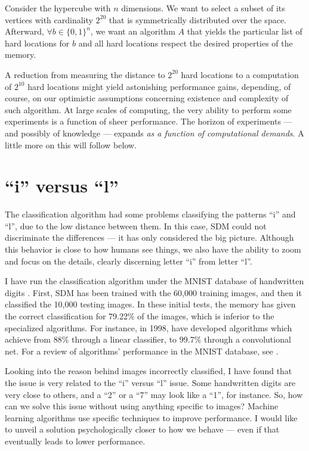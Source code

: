 Consider the hypercube with $n$ dimensions.  We want to select a subset of its vertices with cardinality $2^{20}$ that is symmetrically distributed over the space. Afterward, $\forall b \in \{ 0,1\} ^n$, we want an algorithm $A$ that yields the particular list of hard locations for $b$ and all hard locations respect the desired properties of the memory.

A reduction from measuring the distance to $2^{20}$ hard locations to a computation of $2^{10}$ hard locations might yield astonishing performance gains, depending, of course, on our optimistic assumptions concerning existence and complexity of such algorithm.  At large scales of computing, the very ability to perform some experiments is a function of sheer performance. The horizon of experiments --- and possibly of knowledge --- expands \emph{as a function of computational demands}. A little more on this will follow below.




\section{``i'' versus ``l''}

The classification algorithm had some problems classifying the patterns ``i'' and ``l'', due to the low distance between them. In this case, SDM could not discriminate the differences --- it has only considered the big picture. Although this behavior is close to how humans see things, we also have the ability to zoom and focus on the details, clearly discerning letter ``i'' from letter ``l''.

I have run the classification algorithm under the MNIST database of handwritten digits \citep{deng2012mnist}. First, SDM has been trained with the 60,000 training images, and then it classified the 10,000 testing images. In these initial tests, the memory has given the correct classification for 79.22\% of the images, which is inferior to the specialized algorithms. For instance, in 1998, \citet{lecun1998gradient} have developed algorithms which achieve from 88\% through a linear classifier, to 99.7\% through a convolutional net. For a review of algorithms' performance in the MNIST database, see \cite{deng2012mnist}.

Looking into the reason behind images incorrectly classified, I have found that the issue is very related to the ``i'' versus ``l'' issue. Some handwritten digits are very close to others, and a ``2'' or a ``7'' may look like a ``1'', for instance. So, how can we solve this issue without using anything specific to images?  Machine learning algorithms use specific techniques to improve performance. I would like to unveil a solution psychologically closer to how we behave --- even if that eventually leads to lower performance.

